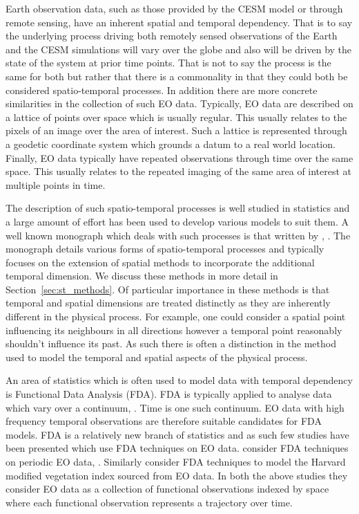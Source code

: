 Earth observation data, such as those provided by the CESM model or through remote sensing, have an inherent spatial and temporal dependency.
That is to say the underlying process driving both remotely sensed observations of the Earth and the CESM simulations will vary over the globe and also will be driven by the state of the system at prior time points.
That is not to say the process is the same for both but rather that there is a commonality in that they could both be considered spatio-temporal processes.
In addition there are more concrete similarities in the collection of such EO data.
Typically, EO data are described on a lattice of points over space which is usually regular.
This usually relates to the pixels of an image over the area of interest.
Such a lattice is represented through a geodetic coordinate system which grounds a datum to a real world location.
Finally, EO data typically have repeated observations through time over the same space.
This usually relates to the repeated imaging of the same area of interest at multiple points in time.

The description of such spatio-temporal processes is well studied in statistics and a large amount of effort has been used to develop various models to suit them.
A well known monograph which deals with such processes is that written by \citeauthor{cressie_statistics_2011}, \cite{cressie_statistics_2011}.
The monograph details various forms of spatio-temporal processes and typically focuses on the extension of spatial methods to incorporate the additional temporal dimension.
We discuss these methods in more detail in Section~\ref{sec:st_methods}.
Of particular importance in these methods is that temporal and spatial dimensions are treated distinctly as they are inherently different in the physical process.
For example, one could consider a spatial point influencing its neighbours in all directions however a temporal point reasonably shouldn't influence its past.
As such there is often a distinction in the method used to model the temporal and spatial aspects of the physical process.

An area of statistics which is often used to model data with temporal dependency is Functional Data Analysis (FDA).
FDA is typically applied to analyse data which vary over a continuum, \citep{ramsay_functional_2010}.
Time is one such continuum.
EO data with high frequency temporal observations are therefore suitable candidates for FDA models.
FDA is a relatively new branch of statistics and as such few studies have been presented which use FDA techniques on EO data.
\citeauthor{liu_functional_2012} consider FDA techniques on periodic EO data, \citep{liu_functional_2012}. 
Similarly \citeauthor{hooker_maximal_2015} consider FDA techniques to model the Harvard modified vegetation index sourced from EO data.
In both the above studies they consider EO data as a collection of functional observations indexed by space where each functional observation represents a trajectory over time.

